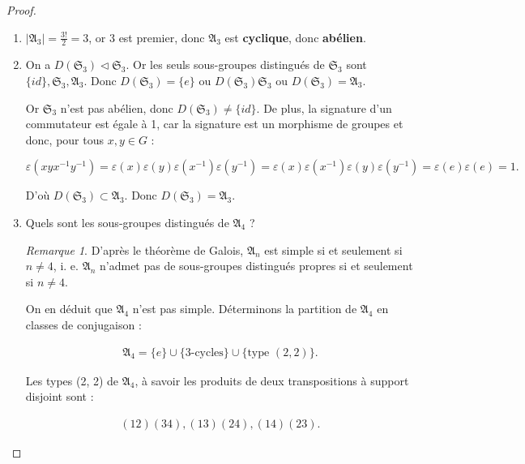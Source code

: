 \documentclass[french]{book}
\theoremstyle{definition}
\theoremstyle{remark}
\newtheorem*{remark}{Remarque}
\begin{document}
\begin{proof}

  \

  \begin{enumerate}
    \item \(\left\lvert \mathfrak{A}_3 \right\rvert = \frac{3!}{2}=3\), or 3 est premier, donc \(\mathfrak{A}_3\) est \textbf{cyclique}, donc \textbf{abélien}.
    \item On a \(D(\mathfrak{S}_{3}) \triangleleft \mathfrak{S}_3\). Or les seuls sous-groupes distingués de \(\mathfrak{S}_{3}\) sont \(\{ id \}, \mathfrak{S}_{3}, \mathfrak{A}_3\). Donc \(D(\mathfrak{S}_{3}) = \{ e \} \text{ ou } D(\mathfrak{S}_{3}) \mathfrak{S}_{3} \text{ ou } D(\mathfrak{S}_{3}) = \mathfrak{A}_{3}\).

    Or \(\mathfrak{S}_{3}\) n'est pas abélien, donc \(D(\mathfrak{S}_{3}) \neq \{ id \}\). De plus, la signature d'un commutateur est égale à 1, car la signature est un morphisme de groupes et donc, pour tous \(x, y \in G\) :

    \[\varepsilon(x y x ^{-1} y ^{-1}) = \varepsilon(x) \varepsilon(y) \varepsilon(x ^{-1}) \varepsilon(y ^{-1}) = \varepsilon(x) \varepsilon(x ^{-1}) \varepsilon(y) \varepsilon(y ^{-1}) = \varepsilon(e)\varepsilon(e) = 1.\]

    D'où \(D(\mathfrak{S}_{3}) \subset \mathfrak{A}_3\). Donc \(D(\mathfrak{S}_{3}) = \mathfrak{A}_3\).

    \item Quels sont les sous-groupes distingués de \(\mathfrak{A}_{4}\) ?

    \begin{remark}
      D'après le théorème de Galois, \(\mathfrak{A}_n\) est simple si et seulement si \(n \neq 4\), i. e. \(\mathfrak{A}_n\) n'admet pas de sous-groupes distingués propres si et seulement si \(n \neq 4\).
    \end{remark}

    On en déduit que \(\mathfrak{A}_4\) n'est pas simple. Déterminons la partition de \(\mathfrak{A}_4\) en classes de conjugaison :

    \begin{gather*}
      \mathfrak{A}_4 = \{ e \} \cup \{ 3\text{-cycles} \} \cup \{ \text{type } (2, 2)\}.
    \end{gather*}

    Les types (2, 2) de \(\mathfrak{A}_{4}\), à savoir les produits de deux transpositions à support disjoint sont :

    \begin{gather*}
      (1 2)(3 4), (1 3)(2 4), (1 4) (2 3).
    \end{gather*}


\end{enumerate}
\end{proof}
\end{document}
